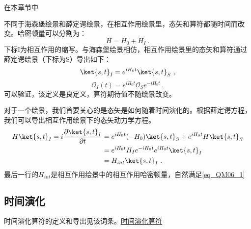 
在本章节中

\begin{definition}{}

不同于海森堡绘景和薛定谔绘景，在相互作用绘景里，态矢和算符都随时间而改变。哈密顿量可以分割为：
\begin{equation}
H=H_0+H_I~.
\end{equation}
下标I为相互作用的缩写。与海森堡绘景相仿，相互作用绘景里的态矢和算符通过薛定谔绘景（下标为S）导出如下：
\begin{equation}
\ket{s,t}_I=e^{iH_0 t}\ket{s,t}_S~,
\end{equation}
\begin{equation}\label{eq_QM06_1}
\mathcal O_I(t)=e^{iH_0 t}\mathcal O_Se^{-iH_0 t}~.
\end{equation}
可以验证，该定义是良定义，算符期待值不随绘景改变。
\end{definition}
对于一个绘景，我们首要关心的是态矢是如何随着时间演化的。根据薛定谔方程，我们可以导出相互作用绘景下的态矢动力学方程。
\begin{equation}
\begin{aligned}
H\ket{s,t}_I=i\frac{\partial\ket{s,t}_I}{\partial t}&= e^{iH_0 t}(-H_0)\ket{s,t}_S+e^{iH_0 t}H\ket{s,t}_S\\
&=e^{iH_0 t}H_Ie^{-iH_0 t}e^{iH_0 t}\ket{s,t}_I\\
&=H_{int}\ket{s,t}_I~.
\end{aligned}
\end{equation}
最后一行的$H_{int}$是相互作用绘景中的相互作用哈密顿量，自然满足\autoref{eq_QM06_1} 
\subsection{时间演化}
时间演化算符的定义和导出见该词条。\href{https://wuli.wiki/online/TOprt.html}{时间演化算符}


